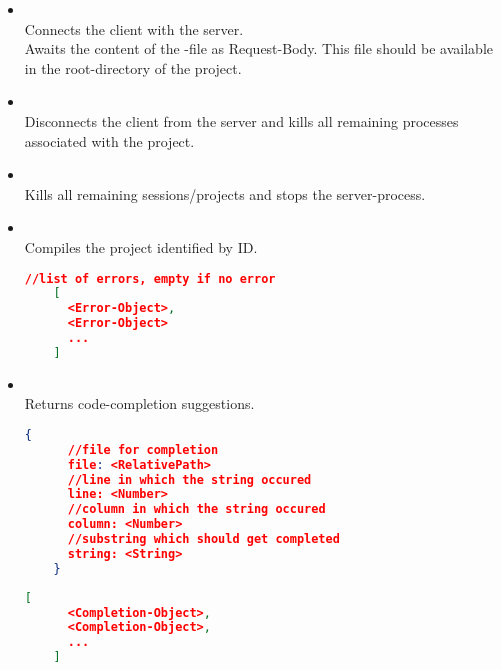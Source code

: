\begin{itemize}
  \item {} \\
  Connects the client with the server. \\
  Awaits the content of the  -file as Request-Body. This file should be
  available in the root-directory of the project. \\

  \item {} \\
  Disconnects the client from the server and kills all remaining processes associated
  with the project. \\

  \item {} \\
  Kills all remaining sessions/projects and stops the server-process. \\

  \item {} \\
  Compiles the project identified by ID. \\
  \begin{lstlisting}[basicstyle=\small,language=json]
    //list of errors, empty if no error
    [
      <Error-Object>,
      <Error-Object>
      ...
    ]
  \end{lstlisting}

  \item {} \\
  Returns code-completion suggestions. \\
  \begin{lstlisting}[basicstyle=\small,
    language=json]
    {
      //file for completion
      file: <RelativePath>
      //line in which the string occured
      line: <Number>
      //column in which the string occured
      column: <Number>
      //substring which should get completed
      string: <String>
    }
  \end{lstlisting}
  \begin{lstlisting}[basicstyle=\small,
    language=json]
    [
      <Completion-Object>,
      <Completion-Object>,
      ...
    ]
  \end{lstlisting}
\end{itemize}

